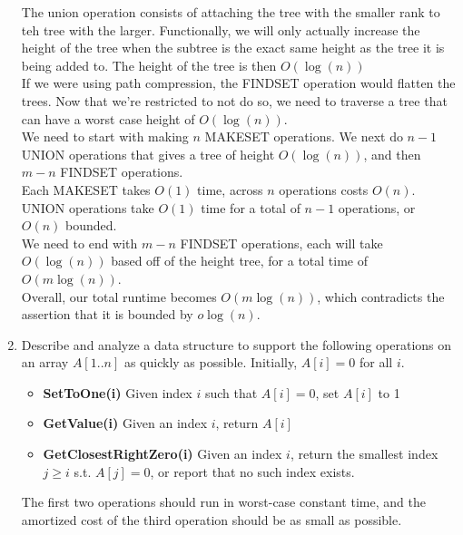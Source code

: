 \documentclass{article}
\begin{document}
\begin{enumerate}
The union operation consists of attaching the tree with the smaller rank to teh tree with the larger. Functionally, we will only actually increase the height of the tree when the subtree is the exact same height as the tree it is being added to. The height of the tree is then $O(\log(n))$ \\
\newline 
If we were using path compression, the FINDSET operation would flatten the trees. Now that we're restricted to not do so, we need to traverse a tree that can have a worst case height of $O(\log(n))$. \\
\newline 
We need to start with making $n$ MAKESET operations. We next do $n-1$ UNION operations that gives a tree of height $O(\log(n))$, and then $m-n$ FINDSET operations. \\
\newline 
Each MAKESET takes $O(1)$ time, across $n$ operations costs $O(n)$. \\
\newline 
UNION operations take $O(1)$ time for a total of $n-1$ operations, or $O(n)$ bounded. \\
\newline 
We need to end with $m-n$ FINDSET operations, each will take $O(\log(n))$ based off of the height tree, for a total time of $O(m\log(n))$. \\
\newline 
Overall, our total runtime becomes $O(m\log(n))$, which contradicts the assertion that it is bounded by $o\log(n)$. 









\newpage
\item Describe and analyze a data structure to support the following operations on an array $A[1..n]$ as quickly as possible. Initially, $A[i] = 0$ for all $i$.
\begin{itemize}
\item \textbf{SetToOne(i)} Given index $i$ such that $A[i] = 0$, set $A[i]$ to 1 
\item \textbf{GetValue(i)} Given an index $i$, return $A[i]$
\item \textbf{GetClosestRightZero(i)} Given an index $i$, return the smallest index $j \geq i$ s.t. $A[j] = 0$, or report that no such index exists.
\end{itemize}
The first two operations should run in worst-case constant time, and the amortized cost of the third operation should be as small as possible.  \\
\newline 


\end{enumerate}
\end{document}

